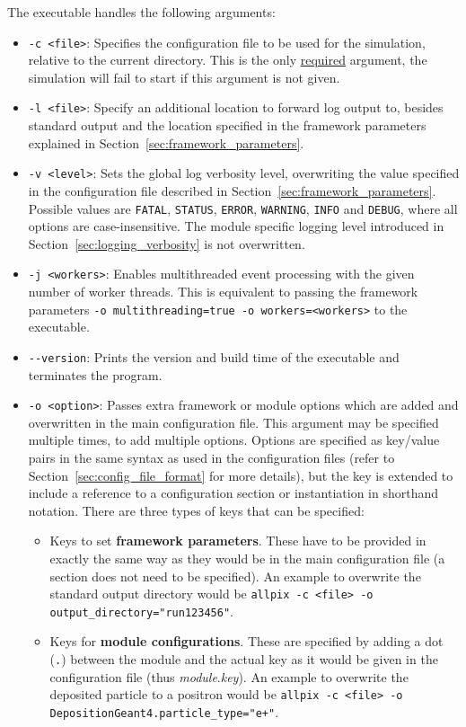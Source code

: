 The executable handles the following arguments:
\begin{itemize}
\item \texttt{-c <file>}: Specifies the configuration file to be used for the simulation, relative to the current directory.
This is the only \underline{required} argument, the simulation will fail to start if this argument is not given.
\item \texttt{-l <file>}: Specify an additional location to forward log output to, besides standard output and the location specified in the framework parameters explained in Section~\ref{sec:framework_parameters}.
\item \texttt{-v <level>}: Sets the global log verbosity level, overwriting the value specified in the configuration file described in Section~\ref{sec:framework_parameters}.
Possible values are \texttt{FATAL}, \texttt{STATUS}, \texttt{ERROR}, \texttt{WARNING}, \texttt{INFO} and \texttt{DEBUG}, where all options are case-insensitive.
The module specific logging level introduced in Section~\ref{sec:logging_verbosity} is not overwritten.
\item \texttt{-j <workers>}: Enables multithreaded event processing with the given number of worker threads. This is equivalent to passing the framework parameters \mbox{\texttt{-o multithreading=true -o workers=<workers>}} to the executable.
\item \texttt{-{}-version}: Prints the version and build time of the executable and terminates the program.
\item \texttt{-o <option>}: Passes extra framework or module options which are added and overwritten in the main configuration file.
This argument may be specified multiple times, to add multiple options.
Options are specified as key/value pairs in the same syntax as used in the configuration files (refer to Section~\ref{sec:config_file_format} for more details), but the key is extended to include a reference to a configuration section or instantiation in shorthand notation.
There are three types of keys that can be specified:
\begin{itemize}
\item Keys to set \textbf{framework parameters}. These have to be provided in exactly the same way as they would be in the main configuration file (a section does not need to be specified). An example to overwrite the standard output directory would be \texttt{allpix -c <file> -o output\_directory="run123456"}.
\item Keys for \textbf{module configurations}. These are specified by adding a dot (\texttt{.}) between the module and the actual key as it would be given in the configuration file (thus \textit{module}.\textit{key}). An example to overwrite the deposited particle to a positron would be \texttt{allpix -c <file> -o DepositionGeant4.particle\_type="e+"}.

\end{itemize}
\end{itemize}
